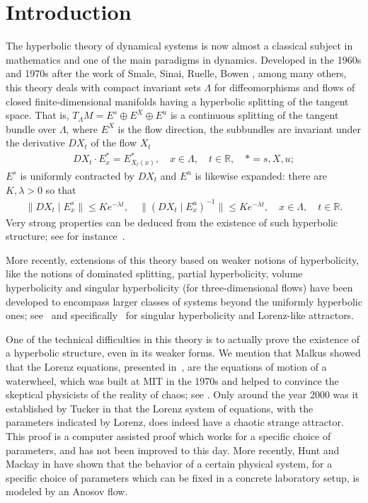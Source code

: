\documentclass[12pt,reqno]{amsart}
\numberwithin{equation}{section}
\theoremstyle{plain}
\theoremstyle{definition}
\newcommand{\RR}{{\mathbb R}}
\begin{document}
\section{Introduction}
\label{sec:introd-statem-result}

The hyperbolic theory of dynamical systems is now almost a
classical subject in mathematics and one of the main
paradigms in dynamics. Developed in the 1960s and 1970s
after the work of Smale, Sinai, Ruelle, Bowen
\cite{Sm67,Si68,Bo75,BR75}, among many others, this theory
deals with compact invariant sets $\Lambda$ for
diffeomorphisms and flows of closed finite-dimensional
manifolds having a hyperbolic splitting of the tangent
space. That is, $T_\Lambda M= E^s\oplus E^X \oplus E^u$ is a
continuous splitting of the tangent bundle over $\Lambda$,
where $E^X$ is the flow direction, the
subbundles are invariant under the derivative $DX_t$ of the
flow $X_t$
\begin{align*}
  DX_t\cdot E^*_x=E^*_{X_t(x)},\quad  x\in\Lambda, \quad t\in\RR,\quad *=s,X,u;
\end{align*}
$E^s$ is uniformly contracted by $DX_t$ and $E^u$ is
likewise expanded: there are $K,\lambda>0$ so that
\begin{align*}
  \|DX_t\mid E^s_x\|\le K e^{-\lambda t},
  \quad
  \|(DX_t \mid E^u_x)^{-1}\|\le K e^{-\lambda t},
  \quad x\in\Lambda, \quad t\in\RR.
\end{align*}
Very strong properties can be deduced from the existence of
such hyperbolic structure; see for
instance~\cite{Bo75,BR75,Sh87,KH95,robinson2004}.

More recently, extensions of this theory based on weaker
notions of hyperbolicity, like the notions of dominated
splitting, partial hyperbolicity, volume hyperbolicity and
singular hyperbolicity (for three-dimensional flows) have
been developed to encompass larger classes of systems beyond
the uniformly hyperbolic ones; see~\cite{BDV2004} and
specifically~\cite{viana2000i,AraPac2010} for singular
hyperbolicity and Lorenz-like attractors.

One of the technical difficulties in this theory is to
actually prove the existence of a hyperbolic structure, even
in its weaker forms.  We mention that Malkus
showed that the Lorenz equations,
presented in~\cite{Lo63}, are the equations of motion of a
waterwheel, which was built at MIT in the 1970s and helped
to convince the skeptical physicists of the reality of
chaos; see \cite[Section 9.1]{strogatz94}.  Only around the
year 2000 was it established by Tucker in \cite{Tu99,Tu2}
that the Lorenz system of equations, with the parameters
indicated by Lorenz, does indeed have a chaotic strange
attractor.  This proof is a computer assisted proof which
works for a specific choice of parameters, and has not been
improved to this day. More recently, Hunt and Mackay in
\cite{HuntMack03} have shown that the behavior of a certain
physical system, for a specific choice of parameters which
can be fixed in a concrete laboratory setup, is modeled by
an Anosov flow.
\end{document}

